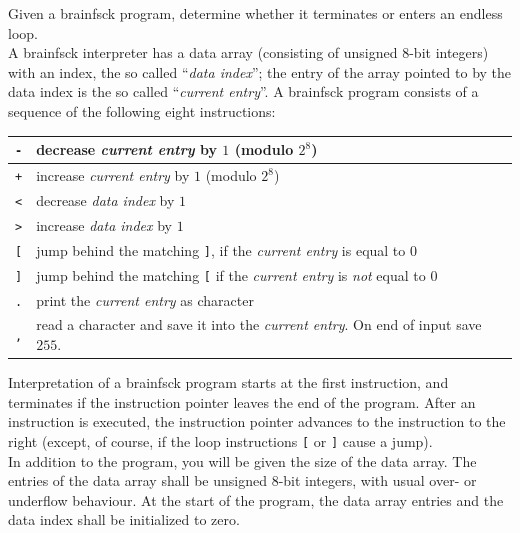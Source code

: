 Given a brainfsck program, determine whether it terminates or enters
an endless loop.\\

A brainfsck interpreter has a data array (consisting of unsigned 8-bit
integers) with an index, the so called ``\emph{data index}''; the
entry of the array pointed to by the data index is the so called
``\emph{current entry}''. A brainfsck program consists of a sequence
of the following eight instructions:

\begin{center}
  \begin{tabular}{|l|l|}
    \hline
    \verb?-? & decrease \emph{current entry} by $1$ (modulo $2^8$)\\
    \hline
    \verb?+? & increase \emph{current entry} by $1$ (modulo $2^8$)\\
    \hline
    \verb+<+ & decrease \emph{data index} by $1$ \\
    \hline
    \verb+>+ & increase \emph{data index} by $1$ \\
    \hline
    \verb+[+ & jump behind the matching \verb+]+, 
    if the \emph{current entry} is equal to 0 \\
    \hline
    \verb+]+ & jump behind the matching \verb+[+ if 
    the \emph{current entry} is \emph{not} equal to $0$\\
    \hline
    \verb+.+ & print the \emph{current entry} as character\\
    \hline
    \verb+,+ & read a character and save it into the \emph{current
    entry}. On end of input save $255$.\\
    \hline
  \end{tabular}
\end{center}

Interpretation of a brainfsck program starts at the first instruction,
and terminates if the instruction pointer leaves the end of the
program. After an instruction is executed, the instruction pointer
advances to the instruction to the right (except, of course, if the
loop instructions \verb+[+ or \verb+]+ cause a jump).\\

In addition to the program, you will be given the size of the data
array. The entries of the data array shall be unsigned 8-bit integers,
with usual over- or underflow behaviour. 
At the start of the program, the data array entries and the data 
index shall be initialized to zero.\\

